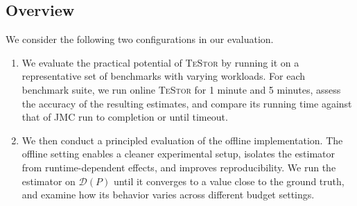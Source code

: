 \documentclass[acmsmall]{acmart}
\newcommand{\testor}{\textsc{TeStor}\xspace}
\newcommand{\jmc}{\textsc{JMC}\xspace}
\newcommand{\pestor}
{\textsc{PeStor}\xspace}
\begin{document}
\subsection{Overview }
We consider the following two configurations in our evaluation.

 
\begin{enumerate}[label=\textbf{(\Alph*)}, leftmargin=2em]
\item \label{phase:online}
We evaluate the practical potential of \testor by running it on a representative set of benchmarks with varying workloads.
For each benchmark suite, we run online \testor for 1 minute and 5 minutes, assess the accuracy of the resulting estimates, and compare its running time against that of \jmc run to completion or until timeout.
\item \label{phase:acp} We then conduct a principled evaluation of the offline implementation. The offline setting enables a cleaner experimental setup, isolates the estimator from runtime-dependent effects, and improves reproducibility. We run the estimator on $\mathcal{D}(P)$ until it converges to a value close to the ground truth, and examine how its behavior varies across different budget settings.


\end{enumerate}  
\end{document}
